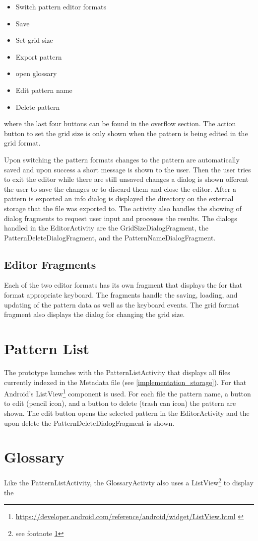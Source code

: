 \begin{itemize}
\item Switch pattern editor formats
\item Save
\item Set grid size
\item Export pattern
\item open glossary
\item Edit pattern name
\item Delete pattern
\end{itemize}

where the last four buttons can be found in the overflow section. The action button to set the grid size is only shown when the pattern is being edited in the grid format.

Upon switching the pattern formats changes to the pattern are automatically saved and upon success a short message is shown to the user. Then the user tries to exit the editor while there are still unsaved changes a dialog is shown offerent the user to save the changes or to discard them and close the editor. After a pattern is exported an info dialog is displayed the directory on the external storage that the file was exported to.
The activity also handles the showing of dialog fragments to request user input and processes the results. The dialogs handled in the EditorActivity are the GridSizeDialogFragment, the PatternDeleteDialogFragment, and the PatternNameDialogFragment.

\subsection{Editor Fragments}
Each of the two editor formats has its own fragment that displays the for that format appropriate keyboard. The fragments handle the saving, loading, and updating of the pattern data as well as the keyboard events. The grid format fragment also displays the dialog for changing the grid size.

\section{Pattern List}
The prototype launches with the PatternListActivity that displays all files currently indexed in the Metadata file (see \ref{implementation_storage}). For that Android's ListView\footnote{\url{https://developer.android.com/reference/android/widget/ListView.html} \label{url_footnote}} component is used. For each file the pattern name, a button to edit (pencil icon), and a button to delete (trash can icon) the pattern are shown. The edit button opens the selected pattern in the EditorActivity and the upon delete the PatternDeleteDialogFragment is shown.

\section{Glossary}
Like the PatternListActivity, the GlossaryActivty also uses a ListView\footnote{see footnote \ref{url_footnote}} to display the 